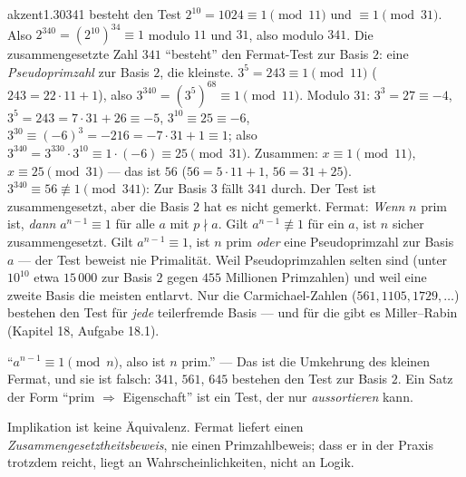 \begin{loesungkarte}{akzent}{1.30}{341 besteht den Test}
$2^{10} = 1024\equiv1\pmod{11}$ und $\equiv1\pmod{31}$. Also $2^{340} = (2^{10})^{34}\equiv1$ modulo $11$ und $31$, also modulo $341$. Die zusammengesetzte Zahl $341$ \enquote{besteht} den Fermat-Test zur Basis $2$: eine \emph{Pseudoprimzahl} zur Basis $2$, die kleinste.
$3^{5} = 243\equiv1\pmod{11}$ ($243 = 22\cdot11 + 1$), also $3^{340} = (3^{5})^{68}\equiv1\pmod{11}$. Modulo $31$: $3^{3} = 27\equiv-4$, $3^{5} = 243 = 7\cdot31 + 26\equiv-5$, $3^{10}\equiv25\equiv-6$, $3^{30}\equiv(-6)^{3} = -216 = -7\cdot31 + 1\equiv1$; also $3^{340} = 3^{330}\cdot3^{10}\equiv1\cdot(-6)\equiv25\pmod{31}$. Zusammen: $x\equiv1\pmod{11}$, $x\equiv25\pmod{31}$ --- das ist $56$ ($56 = 5\cdot11 + 1$, $56 = 31 + 25$). $3^{340}\equiv56\not\equiv1\pmod{341}$: Zur Basis $3$ fällt $341$ durch. Der Test ist zusammengesetzt, aber die Basis $2$ hat es nicht gemerkt.
Fermat: \emph{Wenn} $n$ prim ist, \emph{dann} $a^{n-1}\equiv1$ für alle $a$ mit $p\nmid a$. Gilt $a^{n-1}\not\equiv1$ für ein $a$, ist $n$ sicher zusammengesetzt. Gilt $a^{n-1}\equiv1$, ist $n$ prim \emph{oder} eine Pseudoprimzahl zur Basis $a$ --- der Test beweist nie Primalität.
Weil Pseudoprimzahlen selten sind (unter $10^{10}$ etwa $15\,000$ zur Basis $2$ gegen $455$ Millionen Primzahlen) und weil eine zweite Basis die meisten entlarvt. Nur die Carmichael-Zahlen ($561, 1105, 1729, \dots$) bestehen den Test für \emph{jede} teilerfremde Basis --- und für die gibt es Miller--Rabin (Kapitel 18, Aufgabe 18.1).
\begin{fehler}\kastentext
\enquote{$a^{n-1}\equiv1\pmod n$, also ist $n$ prim.} --- Das ist die Umkehrung des kleinen Fermat, und sie ist falsch: $341$, $561$, $645$ bestehen den Test zur Basis $2$. Ein Satz der Form \enquote{prim $\Rightarrow$ Eigenschaft} ist ein Test, der nur \emph{aussortieren} kann.
\end{fehler}
\begin{mitnehmen}\kastentext
Implikation ist keine Äquivalenz. Fermat liefert einen \emph{Zusammengesetztheitsbeweis}, nie einen Primzahlbeweis; dass er in der Praxis trotzdem reicht, liegt an Wahrscheinlichkeiten, nicht an Logik.
\end{mitnehmen}
\end{loesungkarte}

